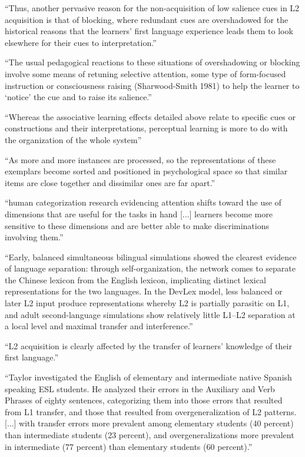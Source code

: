 ``Thus, another pervasive reason for the non-acquisition of low salience cues
in L2 acquisition is that of blocking, where redundant cues are overshadowed
for the historical reasons that the learners’ first language experience leads
them to look elsewhere for their cues to interpretation.''

``The usual pedagogical reactions to these situations of overshadowing or
blocking involve some means of retuning selective attention, some type of
form-focused instruction or consciousness raising (Sharwood-Smith 1981) to
help the learner to ‘notice’ the cue and to raise its salience.''

``Whereas the associative learning effects detailed above relate to specific cues
or constructions and their interpretations, perceptual learning is more to do
with the organization of the whole system''

``As more and more instances are processed,
so the representations of these exemplars become sorted and positioned in
psychological space so that similar items are close together and dissimilar
ones are far apart.''

``human categorization
research evidencing attention shifts toward the use of dimensions that are
useful for the tasks in hand [...] learners
become more sensitive to these dimensions and are better able to make
discriminations involving them.''

``Early, balanced simultaneous bilingual
simulations showed the clearest evidence of language separation: through
self-organization, the network comes to separate the Chinese lexicon from
the English lexicon, implicating distinct lexical representations for the
two languages. In the DevLex model, less balanced or later L2 input
produce representations whereby L2 is partially parasitic on L1, and adult
second-language simulations show relatively little L1–L2 separation at a local
level and maximal transfer and interference.''

``L2 acquisition is clearly affected by the transfer
of learners’ knowledge of their first language.''

``Taylor investigated
the English of elementary and intermediate native Spanish speaking ESL
students. He analyzed their errors in the Auxiliary and Verb Phrases of eighty
sentences, categorizing them into those errors that resulted from L1 transfer,
and those that resulted from overgeneralization of L2 patterns.
[...] with transfer
errors more prevalent among elementary students (40 percent) than
intermediate students (23 percent), and overgeneralizations more prevalent
in intermediate (77 percent) than elementary students (60 percent).''
